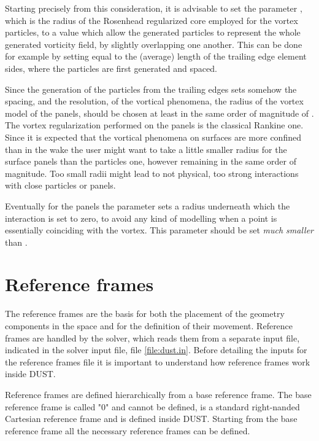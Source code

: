 Starting precisely from this consideration, it is advisable to set the 
parameter , which is the radius of the Rosenhead 
regularized core employed for the vortex particles, to a value which
allow the generated particles to represent the whole generated vorticity 
field, by slightly overlapping one another. This can be done for example 
by setting  equal to the (average) length of the trailing 
edge element sides, where the particles are first generated and spaced.

Since the generation of the particles from the trailing edges sets somehow 
the spacing, and the resolution, of the vortical phenomena, the radius of 
the vortex model of the panels,  should be chosen at least 
in the same order of magnitude of . The vortex 
regularization performed on the panels is the classical Rankine one. 
Since it is expected that the vortical phenomena on surfaces are more 
confined than in the wake the user might want to take a little smaller 
radius for the surface panels than the particles one, however remaining 
in the same order of magnitude. Too small radii might lead to not physical, 
too strong interactions with close particles or panels.

Eventually for the panels the parameter  sets a radius 
underneath which the interaction is set to zero, to avoid any kind of 
modelling when a point is essentially coinciding with the vortex. 
This parameter should be set \emph{much smaller} than . 


\section{Reference frames}
\label{sec:Solver_ReferenceFrames}

The reference frames are the basis for both the placement of the geometry 
components in the space and for the definition of their movement.  
Reference frames are handled by the solver, which reads them from 
a separate input file, indicated in the solver input file, file 
\ref{file:dust.in}. Before detailing the inputs for the reference 
frames file it is important to understand how reference frames work 
inside DUST. %

Reference frames are defined hierarchically from a base reference frame. 
The base reference frame is called "0" and cannot be defined, 
is a standard right-nanded Cartesian reference frame and is defined 
inside DUST. Starting from the base reference frame all the necessary 
reference frames can be defined. 

